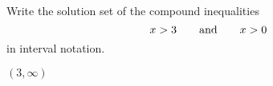 

Write the solution set of the compound inequalities
\[x>3\text{\quad\quad and\quad\quad}  x >0 \]
in interval notation.

\begin{solution}
$(3, \infty)$
\end{solution}